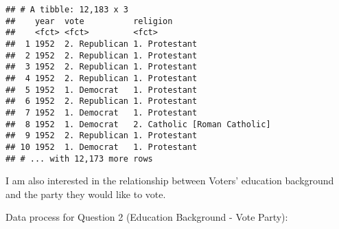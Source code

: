 \documentclass[
]{article}
\newenvironment{Shaded}{\begin{snugshade}}{\end{snugshade}}
\newcommand{\DataTypeTok}[1]{\textcolor[rgb]{0.13,0.29,0.53}{#1}}
\newcommand{\DecValTok}[1]{\textcolor[rgb]{0.00,0.00,0.81}{#1}}
\newcommand{\KeywordTok}[1]{\textcolor[rgb]{0.13,0.29,0.53}{\textbf{#1}}}
\newcommand{\NormalTok}[1]{#1}
\newcommand{\OperatorTok}[1]{\textcolor[rgb]{0.81,0.36,0.00}{\textbf{#1}}}
\newcommand{\StringTok}[1]{\textcolor[rgb]{0.31,0.60,0.02}{#1}}
\begin{document}
\begin{verbatim}
## # A tibble: 12,183 x 3
##    year  vote          religion                    
##    <fct> <fct>         <fct>                       
##  1 1952  2. Republican 1. Protestant               
##  2 1952  2. Republican 1. Protestant               
##  3 1952  2. Republican 1. Protestant               
##  4 1952  2. Republican 1. Protestant               
##  5 1952  1. Democrat   1. Protestant               
##  6 1952  2. Republican 1. Protestant               
##  7 1952  1. Democrat   1. Protestant               
##  8 1952  1. Democrat   2. Catholic [Roman Catholic]
##  9 1952  2. Republican 1. Protestant               
## 10 1952  1. Democrat   1. Protestant               
## # ... with 12,173 more rows
\end{verbatim}

\begin{Shaded}
\end{Shaded}

I am also interested in the relationship between Voters' education
background and the party they would like to vote.

Data process for Question 2 (Education Background - Vote Party):

\begin{Shaded}
\end{Shaded}
\end{document}
